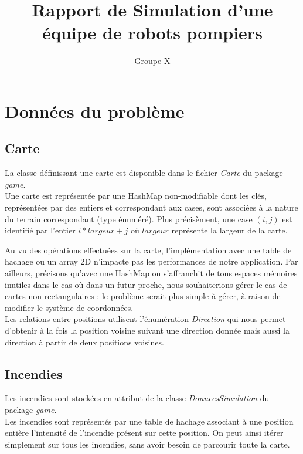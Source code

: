 \documentclass[a4paper, 10pt, french]{article}
\title{Rapport de Simulation d'une équipe de robots pompiers}
\author{Groupe X}
\begin{document}
\maketitle

\section{Données du problème}	

	\subsection{Carte}
	\noindent La classe définissant une carte est disponible dans le fichier {\it Carte} du package {\it game}. \\

	Une carte est représentée par une HashMap non-modifiable dont les clés, représentées par des entiers et correspondant aux cases, sont associées à la nature du terrain correspondant (type énuméré). 
	Plus précisèment, une case $(i, j)$ est identifié par l'entier $i * largeur + j$ où $largeur$ représente la largeur de la carte.
	
	\noindent Au vu des opérations effectuées sur la carte, l'implémentation avec une table de hachage ou un array 2D n'impacte pas les performances de notre application. Par ailleurs, précisons qu'avec une HashMap on s'affranchit de tous espaces mémoires inutiles dans le cas où dans un futur proche, nous souhaiterions gérer le cas de cartes non-rectangulaires : le problème serait plus simple à gérer, à raison de modifier le système de coordonnées. \\

	Les relations entre positions utilisent l'énumération {\it Direction} qui nous permet d'obtenir à la fois la position voisine suivant une direction donnée mais aussi la direction à partir de deux positions voisines.

	\subsection{Incendies}
	\noindent Les incendies sont stockées en attribut de la classe {\it DonneesSimulation} du package {\it game}. \\

	Les incendies sont représentés par une table de hachage associant à une position entière l'intensité de l'incendie présent sur cette position. On peut ainsi itérer simplement sur tous les incendies, sans avoir besoin de parcourir toute la carte.
\end{document}
